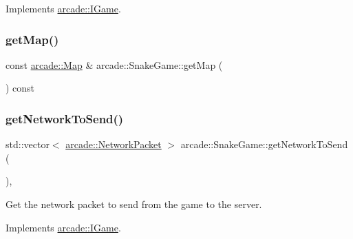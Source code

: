 Implements \hyperlink{classarcade_1_1_i_game_abe849a6ed370a18de51bc8cb7a2329ba}{arcade\+::\+I\+Game}.

\mbox{\label{classarcade_1_1_snake_game_ae11798650684c74dfe0ac61ccb4fc859}} 
\subsubsection{\texorpdfstring{get\+Map()}{getMap()}}
{\footnotesize\ttfamily const \hyperlink{classarcade_1_1_map}{arcade\+::\+Map} \& arcade\+::\+Snake\+Game\+::get\+Map (\begin{DoxyParamCaption}{ }\end{DoxyParamCaption}) const}

\mbox{\label{classarcade_1_1_snake_game_a8666c3ad148b7140658b52a262bfab73}} 
\subsubsection{\texorpdfstring{get\+Network\+To\+Send()}{getNetworkToSend()}}
{\footnotesize\ttfamily std\+::vector$<$ \hyperlink{structarcade_1_1_network_packet}{arcade\+::\+Network\+Packet} $>$ arcade\+::\+Snake\+Game\+::get\+Network\+To\+Send (\begin{DoxyParamCaption}{ }\end{DoxyParamCaption})\hspace{0.3cm}{\ttfamily [override]}, {\ttfamily [virtual]}}



Get the network packet to send from the game to the server. 



Implements \hyperlink{classarcade_1_1_i_game_a5aa80dfdb3c1881fbc749e3d53efc6f8}{arcade\+::\+I\+Game}.

\mbox{\label{classarcade_1_1_snake_game_a4b709bb4139eac56f4f63461ac4324a3}} 
